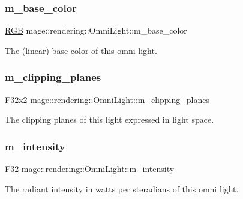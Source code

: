 \subsubsection{\texorpdfstring{m\+\_\+base\+\_\+color}{m\_base\_color}}
{\footnotesize\ttfamily \hyperlink{structmage_1_1_r_g_b}{R\+GB} mage\+::rendering\+::\+Omni\+Light\+::m\+\_\+base\+\_\+color\hspace{0.3cm}{\ttfamily [private]}}

The (linear) base color of this omni light. \hypertarget{classmage_1_1rendering_1_1_omni_light_a725388093feb1e5ed2ebce4f70c1729b}{}\label{classmage_1_1rendering_1_1_omni_light_a725388093feb1e5ed2ebce4f70c1729b} 
\subsubsection{\texorpdfstring{m\+\_\+clipping\+\_\+planes}{m\_clipping\_planes}}
{\footnotesize\ttfamily \hyperlink{namespacemage_aa87237ad091f5cd7da612b8523fc108f}{F32x2} mage\+::rendering\+::\+Omni\+Light\+::m\+\_\+clipping\+\_\+planes\hspace{0.3cm}{\ttfamily [private]}}

The clipping planes of this light expressed in light space. \hypertarget{classmage_1_1rendering_1_1_omni_light_af7ba6e05e5809d16ec070a2b2de47a62}{}\label{classmage_1_1rendering_1_1_omni_light_af7ba6e05e5809d16ec070a2b2de47a62} 
\subsubsection{\texorpdfstring{m\+\_\+intensity}{m\_intensity}}
{\footnotesize\ttfamily \hyperlink{namespacemage_aa97e833b45f06d60a0a9c4fc22ae02c0}{F32} mage\+::rendering\+::\+Omni\+Light\+::m\+\_\+intensity\hspace{0.3cm}{\ttfamily [private]}}

The radiant intensity in watts per steradians of this omni light. \hypertarget{classmage_1_1rendering_1_1_omni_light_af0cb508d0333f86cf64c28f5628177d4}{}\label{classmage_1_1rendering_1_1_omni_light_af0cb508d0333f86cf64c28f5628177d4} 
